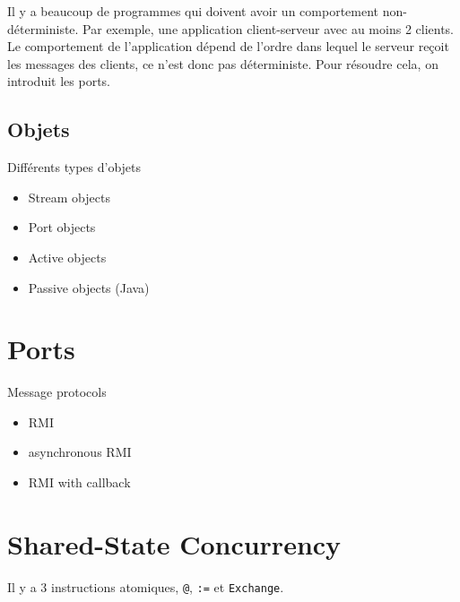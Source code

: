 Il y a beaucoup de programmes qui doivent avoir un comportement non-déterministe.
Par exemple, une application client-serveur avec au moins 2 clients.
Le comportement de l'application dépend de l'ordre dans lequel le serveur
reçoit les messages des clients, ce n'est donc pas déterministe.
Pour résoudre cela, on introduit les ports.

\subsection{Objets}
Différents types d'objets
\begin{itemize}
  \item Stream objects
  \item Port objects
  \item Active objects
  \item Passive objects (Java)
\end{itemize}

\section{Ports}
Message protocols
\begin{itemize}
  \item RMI
  \item asynchronous RMI
  \item RMI with callback
\end{itemize}

\section{Shared-State Concurrency}
Il y a 3 instructions atomiques,
\lstinline|@|, \lstinline|:=| et \lstinline|Exchange|.

